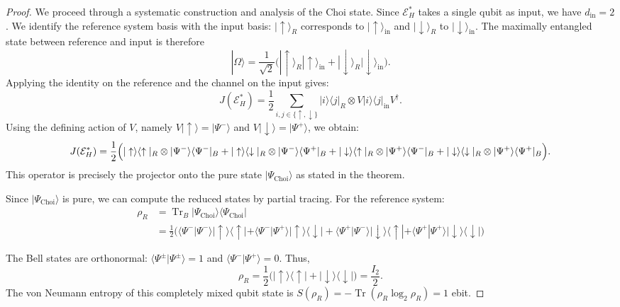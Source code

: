 \documentclass[10pt,a4paper]{amsart}
\begin{document}
\begin{proof}
We proceed through a systematic construction and analysis of the Choi state.
Since $\mathcal{E}_H^*$ takes a single qubit as input, we have $d_{\text{in}}=2$. We identify the reference system basis with the input basis: $|\uparrow\rangle_R$ corresponds to $|\uparrow\rangle_{\text{in}}$ and $|\downarrow\rangle_R$ to $|\downarrow\rangle_{\text{in}}$. The maximally entangled state between reference and input is therefore
\[
|\Omega\rangle = \frac{1}{\sqrt{2}}\bigl(|\uparrow\rangle_R|\uparrow\rangle_{\text{in}} + |\downarrow\rangle_R|\downarrow\rangle_{\text{in}}\bigr).
\]
Applying the identity on the reference and the channel on the input gives:
\[
J(\mathcal{E}_H^*) = \frac{1}{2}\sum_{i,j \in \{\uparrow,\downarrow\}} |i\rangle\langle j|_R \otimes V|i\rangle\langle j|_{\text{in}} V^\dagger.
\]
Using the defining action of $V$, namely $V|\uparrow\rangle = |\Psi^-\rangle$ and $V|\downarrow\rangle = |\Psi^+\rangle$, we obtain:
\[
J(\mathcal{E}_H^*) = \frac{1}{2}\Bigl( |\uparrow\rangle\langle\uparrow|_R \otimes |\Psi^-\rangle\langle\Psi^-|_B + |\uparrow\rangle\langle\downarrow|_R \otimes |\Psi^-\rangle\langle\Psi^+|_B + |\downarrow\rangle\langle\uparrow|_R \otimes |\Psi^+\rangle\langle\Psi^-|_B + |\downarrow\rangle\langle\downarrow|_R \otimes |\Psi^+\rangle\langle\Psi^+|_B \Bigr).
\]
This operator is precisely the projector onto the pure state $|\Psi_{\mathrm{Choi}}\rangle$ as stated in the theorem.

\vspace{0.5em}

Since $|\Psi_{\mathrm{Choi}}\rangle$ is pure, we can compute the reduced states by partial tracing. For the reference system:
\begin{align*}
\rho_R &= \operatorname{Tr}_B |\Psi_{\mathrm{Choi}}\rangle\langle\Psi_{\mathrm{Choi}}|\\
&= \frac{1}{2}\bigl(\langle\Psi^-|\Psi^-\rangle |\uparrow\rangle\langle\uparrow| + \langle\Psi^-|\Psi^+\rangle|\uparrow\rangle\langle\downarrow| + \langle\Psi^+|\Psi^-\rangle|\downarrow\rangle\langle\uparrow| + \langle\Psi^+|\Psi^+\rangle|\downarrow\rangle\langle\downarrow| \bigr)
\end{align*}


The Bell states are orthonormal: $\langle\Psi^\pm|\Psi^\pm\rangle=1$ and $\langle\Psi^-|\Psi^+\rangle=0$. Thus,
\[
\rho_R = \frac{1}{2}\bigl(|\uparrow\rangle\langle\uparrow| + |\downarrow\rangle\langle\downarrow|\bigr) = \frac{I_2}{2}.
\]
The von Neumann entropy of this completely mixed qubit state is $S(\rho_R) = -\operatorname{Tr}(\rho_R \log_2 \rho_R) = 1$ ebit.


\end{proof}
\end{document}

